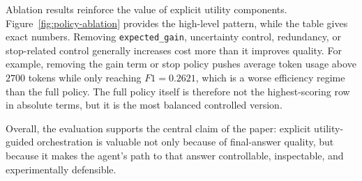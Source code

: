 

Ablation results reinforce the value of explicit utility components. Figure~\ref{fig:policy-ablation} provides the high-level pattern, while the table gives exact numbers. Removing \texttt{expected\_gain}, uncertainty control, redundancy, or stop-related control generally increases cost more than it improves quality. For example, removing the gain term or stop policy pushes average token usage above $2700$ tokens while only reaching $F1=0.2621$, which is a worse efficiency regime than the full policy. The full policy itself is therefore not the highest-scoring row in absolute terms, but it is the most balanced controlled version.

Overall, the evaluation supports the central claim of the paper: explicit utility-guided orchestration is valuable not only because of final-answer quality, but because it makes the agent's path to that answer controllable, inspectable, and experimentally defensible.
